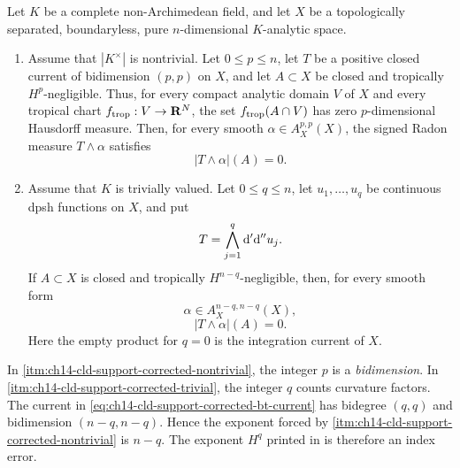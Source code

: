 
\begin{theorem}
\label{thm:ch14-cld-support-corrected-packet}
Let $K$ be a complete non-Archimedean field, and let $X$ be a
topologically separated, boundaryless, pure $n$-dimensional $K$-analytic
space.
\begin{enumerate}
\item\label{itm:ch14-cld-support-corrected-nontrivial}
Assume that $|K^\times|$ is nontrivial.  Let $0\leq p\leq n$, let $T$ be a
positive closed current of bidimension $(p,p)$ on $X$, and let $A\subset X$
be closed and tropically $H^p$-negligible.  Thus, for every compact analytic
domain $V$ of $X$ and every tropical chart
$f_{\mathrm{trop}}:V\to\mathbf R^N$, the set $f_{\mathrm{trop}}(A\cap V)$ has zero
$p$-dimensional Hausdorff measure.  Then, for every smooth
$\alpha\in A_X^{p,p}(X)$, the signed Radon measure $T\wedge\alpha$ satisfies
\begin{equation}
\label{eq:ch14-cld-support-corrected-nontrivial}
                       |T\wedge\alpha|(A)=0.
\end{equation}

\item\label{itm:ch14-cld-support-corrected-trivial}
Assume that $K$ is trivially valued.  Let $0\leq q\leq n$, let
$u_1,\ldots,u_q$ be continuous dpsh functions on $X$, and put
\begin{equation}
\label{eq:ch14-cld-support-corrected-bt-current}
                    T=\bigwedge_{j=1}^{q}\mathrm d'\mathrm d'' u_j.
\end{equation}
If $A\subset X$ is closed and tropically $H^{n-q}$-negligible, then, for
every smooth form
\[
                         \alpha\in A_X^{n-q,n-q}(X),
\]
\begin{equation}
\label{eq:ch14-cld-support-corrected-trivial}
                         |T\wedge\alpha|(A)=0.
\end{equation}
Here the empty product for $q=0$ is the integration current of $X$.
\end{enumerate}
\end{theorem}

\begin{remark}
\label{rem:ch14-cld-support-corrected-index}
In \cref{itm:ch14-cld-support-corrected-nontrivial}, the integer $p$ is a
\emph{bidimension}.  In \cref{itm:ch14-cld-support-corrected-trivial}, the
integer $q$ counts curvature factors.  The current in
\eqref{eq:ch14-cld-support-corrected-bt-current} has bidegree $(q,q)$ and
bidimension $(n-q,n-q)$.  Hence the exponent forced by
\cref{itm:ch14-cld-support-corrected-nontrivial} is $n-q$.  The exponent
$H^q$ printed in \cite[Corollary~16.8.6]{CLD25} is therefore an index error.
\end{remark}

